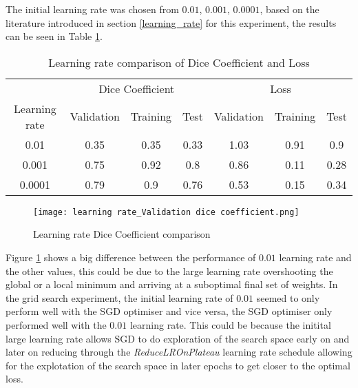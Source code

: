 The initial learning rate was chosen from $0.01$, $0.001$, $0.0001$, based on the literature introduced in section \ref{learning_rate} for this experiment, the results can be seen in Table \ref{tab_lr}.

\begin{table}[ht!] 
    \begin{center}
    \begin{tabular}{ccccccc} 
    \toprule
       & \multicolumn{3}{c}{Dice Coefficient}     & \multicolumn{3}{c}{Loss} \\
    Learning rate & Validation & Training & Test & Validation    & Training    & Test   \\ \midrule
    0.01 & 0.35 & 0.35 & 0.33 & 1.03 & 0.91 & 0.9  \\ 0.001 & 0.75 & 0.92 & 0.8 & 0.86 & 0.11 & 0.28  \\ \rowcolor{lightgray} 0.0001 & 0.79 & 0.9 & 0.76 & 0.53 & 0.15 & 0.34  \\
\bottomrule
    \end{tabular}
  \end{center} 
  \caption{Learning rate comparison of Dice Coefficient and Loss}\label{tab_lr}
\end{table}
\begin{figure}[hbt!]

\centering
    \texttt{[image: learning rate\_Validation dice coefficient.png]}
    \caption{Learning rate Dice Coefficient comparison}
    \label{lr_dice}
\end{figure}

Figure \ref{lr_dice} shows a big difference between the performance of $0.01$ learning rate and the other values, this could be due to the large learning rate overshooting the global or a local minimum and arriving at a suboptimal final set of weights.
In the grid search experiment, the initial learning rate of $0.01$ seemed to only perform well with the \gls{SGD} optimiser and vice versa, the \gls{SGD}  optimiser only performed well with the $0.01$ learning rate. This could be because the initital large learning rate allows SGD to do exploration of the search space early on and later on reducing through the \textit{ReduceLROnPlateau} learning rate schedule allowing for the explotation of the search space in later epochs to get closer to the optimal loss.

